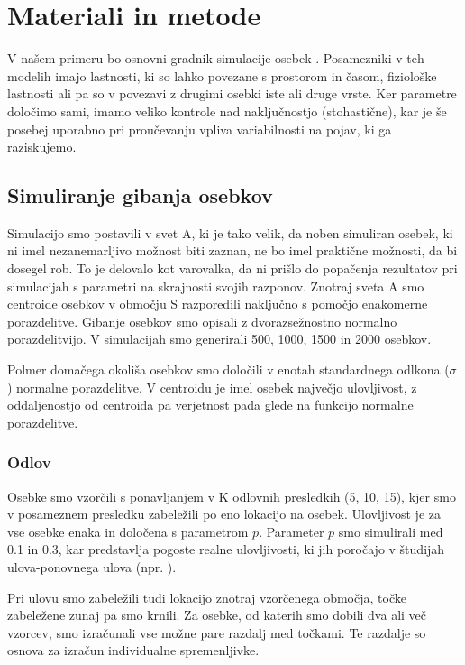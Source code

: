 \section{Materiali in metode}
V našem primeru bo osnovni gradnik simulacije osebek \citep{deangelis_individual-based_2014}. Posamezniki v teh modelih imajo lastnosti, ki so lahko povezane s prostorom in časom, fiziološke lastnosti ali pa so v povezavi z drugimi osebki iste ali druge vrste. Ker parametre določimo sami, imamo veliko kontrole nad naključnostjo (stohastične), kar je še posebej uporabno pri proučevanju vpliva variabilnosti na pojav, ki ga raziskujemo.

\subsection{Simuliranje gibanja osebkov}
Simulacijo smo postavili v svet A, ki je tako velik, da noben simuliran osebek, ki ni imel nezanemarljivo možnost biti zaznan, ne bo imel praktične možnosti, da bi dosegel rob. To je delovalo kot varovalka, da ni prišlo do popačenja rezultatov pri simulacijah s parametri na skrajnosti svojih razponov. Znotraj sveta A smo centroide osebkov v območju S razporedili naključno s pomočjo enakomerne porazdelitve. Gibanje osebkov smo opisali z dvorazsežnostno normalno porazdelitvijo. V simulacijah smo generirali 500, 1000, 1500 in 2000 osebkov.

Polmer domačega okoliša osebkov smo določili v enotah standardnega odlkona ($\sigma$) normalne porazdelitve. V centroidu je imel osebek največjo ulovljivost, z oddaljenostjo od centroida pa verjetnost pada glede na funkcijo normalne porazdelitve.

\subsubsection{Odlov}
Osebke smo vzorčili s ponavljanjem v K odlovnih presledkih (5, 10, 15), kjer smo v posameznem presledku zabeležili po eno lokacijo na osebek. Ulovljivost je za vse osebke enaka in določena s parametrom $p$. Parameter $p$ smo simulirali med 0.1 in 0.3, kar predstavlja pogoste realne ulovljivosti, ki jih poročajo v študijah ulova-ponovnega ulova (npr. \citet{wilson_evaluation_1985, foster_critique_2012, chandler_characterizing_2018}).

Pri ulovu smo zabeležili tudi lokacijo znotraj vzorčenega območja, točke zabeležene zunaj pa smo krnili. Za osebke, od katerih smo dobili dva ali več vzorcev, smo izračunali vse možne pare razdalj med točkami. Te razdalje so osnova za izračun individualne spremenljivke.

